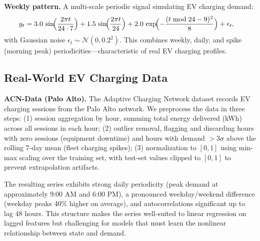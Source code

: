 
\textbf{Weekly pattern.} A multi-scale periodic signal simulating EV charging
demand:
\begin{align}
y_t ={} & 3.0\,\sin\!\Bigl(\frac{2\pi t}{24\cdot 7}\Bigr)
        + 1.5\,\sin\!\Bigl(\frac{2\pi t}{24}\Bigr)
        + 2.0\,\exp\!\Bigl(-\frac{(t \bmod 24 - 9)^2}{8}\Bigr)
        + \epsilon_t,
\end{align}
with Gaussian noise $\epsilon_t \sim \mathcal{N}(0, 0.2^2)$. This combines
weekly, daily, and spike (morning peak) periodicities—characteristic of
real EV charging profiles.


\subsection{Real-World EV Charging Data}


\textbf{ACN-Data (Palo Alto).} The Adaptive Charging Network dataset
\citep{acaroglu2022acn} records EV charging sessions from the Palo Alto
network. We preprocess the data in three steps: (1) session aggregation
by hour, summing total energy delivered (kWh) across all sessions in
each hour; (2) outlier removal, flagging and discarding hours with
zero sessions (equipment downtime) and hours with demand $> 3\sigma$
above the rolling 7-day mean (fleet charging spikes); (3) normalization
to $[0,1]$ using min-max scaling over the training set, with test-set
values clipped to $[0,1]$ to prevent extrapolation artifacts.


The resulting series exhibits strong daily periodicity (peak demand at
approximately 9:00 AM and 6:00 PM), a pronounced weekday/weekend
difference (weekday peaks 40\% higher on average), and autocorrelations
significant up to lag 48 hours. This structure makes the series well-suited
to linear regression on lagged features but challenging for models that
must learn the nonlinear relationship between state and demand.


